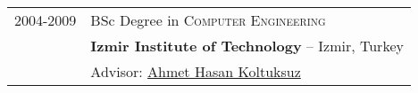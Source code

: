 \documentclass[a4paper,9pt]{article} %
\begin{document}
\begin{tabular}{rl}

2004-2009& BSc Degree in \textsc{}\textsc{Computer Engineering}\\%
& \normalsize\textbf{Izmir Institute of Technology} -- Izmir, Turkey\\
& Advisor: \href{https://staff.yasar.edu.tr/Create/Cv/VDBSVmVWUkhaM3BOYTA1Ml$xwUkJlazFVWnpB45$xYSR/tr}{Ahmet Hasan Koltuksuz}



\end{tabular}





\end{document}
